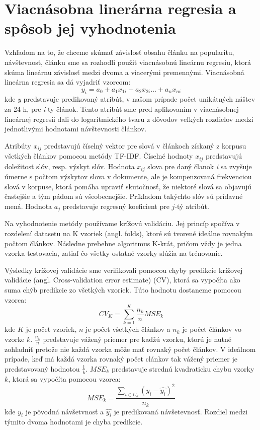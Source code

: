 \documentclass[runningheads,a4paper]{llncs}
\begin{document}
\section{Viacnásobna linerárna regresia a spôsob jej vyhodnotenia}
Vzhľadom na to, že chceme skúmať závislosť obsahu článku na popularitu, návštevnosť, článku sme sa rozhodli použiť viacnásobnú lineárnu regresiu, ktorá skúma lineárnu závislosť medzi dvoma a viacerými premennými. Viacnásobná lineárna regresia sa dá vyjadriť vzorcom: 
\begin{displaymath}
y_i = a_0 + a_1x_{1i} +  a_2x_{2i} \ldots + a_nx_{ni}
\end{displaymath}
kde {\em y} predstavuje predikovaný atribút, v našom prípade počet unikátných náštev za 24 h, pre {\em i}-ty článok. Tento atribút sme pred aplikovaním v viacnásobnej lineárnej regresii dali do logaritmického tvaru z dôvodov veľkých rozdielov medzi jednotlivými hodnotami návštevnosti článkov. 

Atribúty $x_{ij}$ predstavujú číselný vektor pre slová v článkoch získaný z korpusu všetkých článkov pomocou metódy TF-IDF. Číselné hodnoty $x_{ij}$ predstavujú doležitosť slóv, resp. výskyt slóv. Hodnota $x_{ij}$ slova pre daný članok {\em i} sa zvyšuje úmerne s počtom výskytov slova v dokumente, ale je kompenzovaná frekvenciou slová v korpuse, ktorá pomáha upraviť skutočnosť, že niektoré slová sa objavujú častejšie a tým pádom sú všeobecnejšie. Príkladom takýchto slóv sú prídavné mená. Hodnota $a_j$ predstavuje regresný koeficient pre $j$-tý atribút. 
      
Na vyhodnotenie metódy používame krížovú validáciu. Jej princíp spočíva v rozdelení datasetu na K vzoriek (angl. folds), ktoré sú tvorené ideálne rovnakým počtom článkov. Následne prebehne algoritmus K-krát, pričom vždy je jedna vzorka testovacia, zatiaľ čo všetky ostatné vzorky slúžia na trénovanie.

Výsledky krížovej validácie sme verifikovali pomocou chyby predikcie krížovej validácie (angl. Cross-validation error estimate) (CV), ktorá sa vypočíta ako suma chýb predikcie zo všetkých vzoriek. Túto hodnotu dostaneme pomocou vzorca: 
\begin{displaymath}
CV_K = \sum_{k=1}^K \frac{n_k}{n} MSE_k
\end{displaymath}
kde $K$ je počet vzoriek, $n$ je počet všetkých článkov a $n_k$ je počet článkov vo vzorke $k$. $\frac{n_k}{n}$ predstavuje vážený priemer pre kadžú vzorku, ktorú je nutné zohladniť pretože nie každá vzorka môže mať rovnaký počet článkov. V ideálnom prípade, keď má každá vzorka rovnaký počet clánkov tak vážený priemer je predstavovaný hodnotou $\frac{1}{k}$. $MSE_k$ predstavuje strednú kvadraticku chybu vzorky $k$, ktorá sa vypočíta pomocou vzorca:
\begin{displaymath}
MSE_k = \frac{\sum_{i \in C_k}(y_i-\hat{y_i})^2}{n_k}
\end{displaymath}
kde $y_i$ je pôvodná návšetvnosť a $\hat{y_i}$ je predikovaná návšetevnosť. Rozdiel medzi týmito dvoma hodnotami je chyba predikcie.
\end{document}
